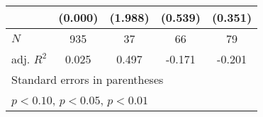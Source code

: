 {\begin{tabular}{l*{4}{c}}
            &     (0.000)         &     (1.988)         &     (0.539)         &     (0.351)         \\
\hline
\(N\)       &         935         &          37         &          66         &          79         \\
adj. \(R^{2}\)&       0.025         &       0.497         &      -0.171         &      -0.201         \\
\hline\hline
\multicolumn{5}{l}{\footnotesize Standard errors in parentheses}\\
\multicolumn{5}{l}{\footnotesize \sym{*} \(p<0.10\), \sym{**} \(p<0.05\), \sym{***} \(p<0.01\)}\\
\end{tabular}
}
